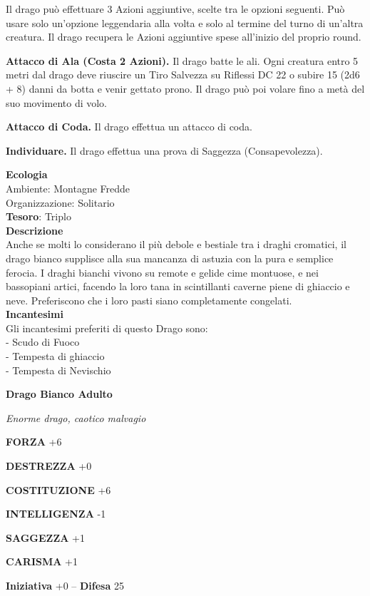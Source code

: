 \begin{multicols}{2}
Il drago può effettuare 3 Azioni aggiuntive, scelte tra le opzioni seguenti. Può usare solo un'opzione leggendaria alla volta e solo al termine del turno di un'altra creatura. Il drago recupera le Azioni aggiuntive spese all'inizio del proprio round.

\textbf{Attacco di Ala (Costa 2 Azioni).} Il drago batte le ali. Ogni creatura entro 5 metri dal drago deve riuscire un Tiro Salvezza su Riflessi DC 22 o subire 15 (2d6 + 8) danni da botta e venir gettato prono. Il drago può poi volare fino a metà del suo movimento di volo.

\textbf{Attacco di Coda.} Il drago effettua un attacco di coda.

\textbf{Individuare.} Il drago effettua una prova di Saggezza (Consapevolezza).

\textbf{Ecologia}\\
Ambiente: Montagne Fredde\\
Organizzazione: Solitario\\
\textbf{Tesoro}: Triplo\\
\textbf{Descrizione}\\
Anche se molti lo considerano il più debole e bestiale tra i draghi cromatici, il drago bianco supplisce alla sua mancanza di astuzia con la pura e semplice ferocia. I draghi bianchi vivono su remote e gelide cime montuose, e nei bassopiani artici, facendo la loro tana in scintillanti caverne piene di ghiaccio e neve. Preferiscono che i loro pasti siano completamente congelati.\\

\textbf{Incantesimi}\\
Gli incantesimi preferiti di questo Drago sono:\\
- Scudo di Fuoco\\
- Tempesta di ghiaccio\\
- Tempesta di Nevischio


\medskip{}\textbf{Drago Bianco Adulto}

\textit{Enorme drago, caotico malvagio}

\textbf{FORZA} +6

\textbf{DESTREZZA} +0

\textbf{COSTITUZIONE} +6

\textbf{INTELLIGENZA} -1

\textbf{SAGGEZZA} +1

\textbf{CARISMA} +1

\textbf{Iniziativa} +0 -- \textbf{Difesa} 25


\end{multicols}
